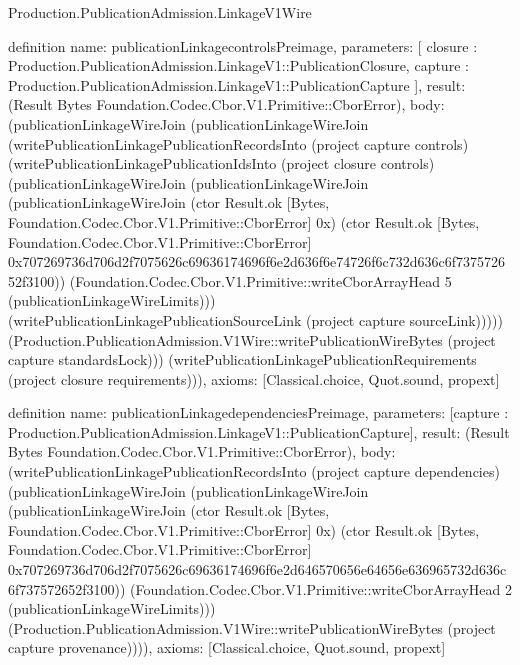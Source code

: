 \begin{lexlean}{Production.PublicationAdmission.LinkageV1Wire}
\begin{semanticmodule}
definition{
  name: publicationLinkagecontrolsPreimage,
  parameters: [
    closure : Production.PublicationAdmission.LinkageV1::PublicationClosure,
    capture : Production.PublicationAdmission.LinkageV1::PublicationCapture
  ],
  result: (Result Bytes Foundation.Codec.Cbor.V1.Primitive::CborError),
  body: (publicationLinkageWireJoin (publicationLinkageWireJoin (writePublicationLinkagePublicationRecordsInto (project capture controls) (writePublicationLinkagePublicationIdsInto (project closure controls) (publicationLinkageWireJoin (publicationLinkageWireJoin (publicationLinkageWireJoin (ctor Result.ok [Bytes, Foundation.Codec.Cbor.V1.Primitive::CborError] 0x) (ctor Result.ok [Bytes, Foundation.Codec.Cbor.V1.Primitive::CborError] 0x707269736d706d2f7075626c69636174696f6e2d636f6e74726f6c732d636c6f737572652f3100)) (Foundation.Codec.Cbor.V1.Primitive::writeCborArrayHead 5 (publicationLinkageWireLimits))) (writePublicationLinkagePublicationSourceLink (project capture sourceLink))))) (Production.PublicationAdmission.V1Wire::writePublicationWireBytes (project capture standardsLock))) (writePublicationLinkagePublicationRequirements (project closure requirements))),
  axioms: [Classical.choice, Quot.sound, propext]
}

definition{
  name: publicationLinkagedependenciesPreimage,
  parameters: [capture : Production.PublicationAdmission.LinkageV1::PublicationCapture],
  result: (Result Bytes Foundation.Codec.Cbor.V1.Primitive::CborError),
  body: (writePublicationLinkagePublicationRecordsInto (project capture dependencies) (publicationLinkageWireJoin (publicationLinkageWireJoin (publicationLinkageWireJoin (ctor Result.ok [Bytes, Foundation.Codec.Cbor.V1.Primitive::CborError] 0x) (ctor Result.ok [Bytes, Foundation.Codec.Cbor.V1.Primitive::CborError] 0x707269736d706d2f7075626c69636174696f6e2d646570656e64656e636965732d636c6f737572652f3100)) (Foundation.Codec.Cbor.V1.Primitive::writeCborArrayHead 2 (publicationLinkageWireLimits))) (Production.PublicationAdmission.V1Wire::writePublicationWireBytes (project capture provenance)))),
  axioms: [Classical.choice, Quot.sound, propext]
}


\end{semanticmodule}
\end{lexlean}
